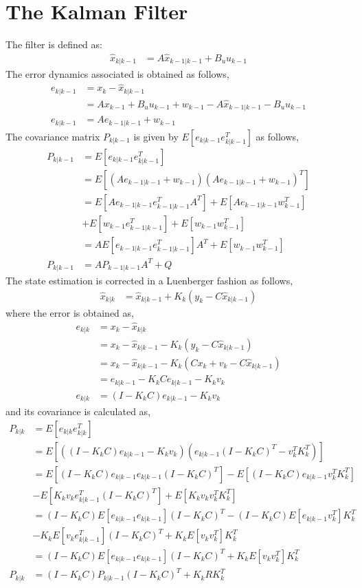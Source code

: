 \documentclass{article}
\begin{document}
\section{The Kalman Filter}
The filter is defined as:
\begin{align}
    \hat{x}_{k|k-1} &= A \hat{x}_{k-1|k-1} + B_u u_{k-1} 
\end{align}
The error dynamics associated is obtained as follows,
\begin{align}
    e_{k|k-1} &= x_{k}-\hat{x}_{k|k-1}\\
    &=A x_{k-1} + B_u u_{k-1} + w_{k-1}-A \hat{x}_{k-1|k-1} - B_u u_{k-1} \\
    e_{k|k-1} &=A e_{k-1|k-1}+w_{k-1}
\end{align}
The covariance matrix $P_{k|k-1}$ is given by $E[e_{k|k-1}e_{k|k-1}^T]$ as follows,
\begin{align}
    P_{k|k-1} &=E[e_{k|k-1}e_{k|k-1}^T]\\
    &=E[(A e_{k-1|k-1}+w_{k-1})(A e_{k-1|k-1}+w_{k-1})^T]\\
    &=E[A e_{k-1|k-1} e_{k-1|k-1}^T A^T] + E[A e_{k-1|k-1} w_{k-1}^T] \\
    &+ E[w_{k-1} e_{k-1|k-1}^T] + E[w_{k-1} w_{k-1}^T]\\
    &=A E[e_{k-1|k-1} e_{k-1|k-1}^T] A^T + E[w_{k-1} w_{k-1}^T]\\
    P_{k|k-1} &=A P_{k-1|k-1} A^T + Q
\end{align}
The state estimation is corrected in a Luenberger fashion as follows,
\begin{align}
    \hat{x}_{k|k} &= \hat{x}_{k|k-1} + K_k \left( y_k - C \hat{x}_{k|k-1} \right)
\end{align}
where the error is obtained as,
\begin{align}
    e_{k|k} &= x_k - \hat{x}_{k|k}\\
    &=x_k - \hat{x}_{k|k-1} - K_k \left( y_k - C \hat{x}_{k|k-1} \right)\\
    &=x_k - \hat{x}_{k|k-1} - K_k \left(  C x_k + v_k - C \hat{x}_{k|k-1} \right)\\
    &=e_{k|k-1} - K_k C e_{k|k-1}-K_k v_k\\
    e_{k|k} &= (I-K_k C) e_{k|k-1} - K_k v_k
\end{align}
and its covariance is calculated as,
\begin{align}
    P_{k|k} &= E[e_{k|k} e_{k|k}^T]\\
    &=E[((I-K_k C) e_{k|k-1} - K_k v_k )(e_{k|k-1}(I-K_k C)^T  - v_k^T K_k^T)]\\
    &=E[(I-K_k C) e_{k|k-1}e_{k|k-1}(I-K_k C)^T]-E[(I-K_k C) e_{k|k-1}v_k^T K_k^T]\\
    &-E[K_k v_k e_{k|k-1}^T(I-K_k C)^T]+E[K_k v_k v_k^T K_k^T ]\\
    &=(I-K_k C) E[e_{k|k-1}e_{k|k-1}](I-K_k C)^T-(I-K_k C)E[e_{k|k-1}v_k^T]K_k^T\\
    &-K_k E[v_k e_{k|k-1}^T](I-K_k C)^T+K_kE[v_k v_k^T] K_k^T\\
    &=(I-K_k C) E[e_{k|k-1}e_{k|k-1}](I-K_k C)^T+K_kE[v_k v_k^T] K_k^T\\
    P_{k|k} &=(I-K_k C) P_{k|k-1} (I-K_k C)^T+K_k R K_k^T
\end{align}
\end{document}
